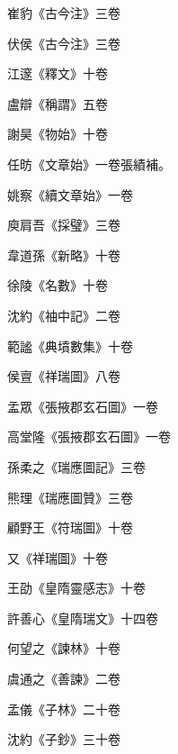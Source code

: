 \begin{pinyinscope}
 崔豹《古今注》三卷



 伏侯《古今注》三卷



 江邃《釋文》十卷



 盧辯《稱謂》五卷



 謝昊《物始》十卷



 任昉《文章始》一卷張績補。



 姚察《續文章始》一卷



 庾肩吾《採璧》三卷



 韋道孫《新略》十卷



 徐陵《名數》十卷



 沈約《袖中記》二卷



 範謐《典墳數集》十卷



 侯亶《祥瑞圖》八卷



 孟眾《張掖郡玄石圖》一卷



 高堂隆《張掖郡玄石圖》一卷



 孫柔之《瑞應圖記》三卷



 熊理《瑞應圖贊》三卷



 顧野王《符瑞圖》十卷



 又《祥瑞圖》十卷



 王劭《皇隋靈感志》十卷



 許善心《皇隋瑞文》十四卷



 何望之《諫林》十卷



 虞通之《善諫》二卷



 孟儀《子林》二十卷



 沈約《子鈔》三十卷




\end{pinyinscope}
